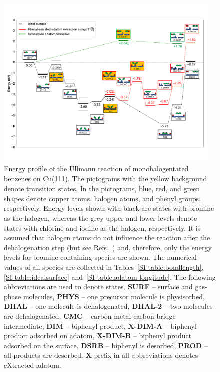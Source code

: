\documentclass[aps,prb,amsmath,amssymb,11pt]{revtex4-1}
\newcommand{\zhzh}{\color{black}}
\begin{document}
\begin{figure}[bt]
\centering
\includegraphics[width=0.96\textwidth]{Fig/main-profile.pdf}
\caption{
Energy profile of the Ullmann reaction of monohalogentated benzenes on Cu(111). {\zhzh The pictograms with the yellow background denote transition states.} In the pictograms, blue, red, and green shapes denote copper atoms, halogen atoms, and phenyl groups, respectively. %
Energy levels shown with black are states with bromine as the halogen, whereas the grey upper and lower levels denote states with chlorine and iodine as the halogen, respectively. It is assumed that halogen atoms do not influence the reaction after the dehalogenation step (but see Refs.~) and, therefore, only the energy levels for bromine containing species are shown. The numerical values of all species are collected in Tables~\ref{SI-table:bondlength}, \ref{SI-table:idealsurface} and~\ref{SI-table:adatom-longitude}. {\zhzh The following abbreviations are used to denote states. \textbf{SURF} -- surface and gas-phase molecules, \textbf{PHYS} -- one precursor molecule is physisorbed, \textbf{DHAL} -- one molecule is dehalogenated, \textbf{DHAL-2} -- two molecules are dehalogenated, \textbf{CMC} -- carbon-metal-carbon bridge intermediate, \textbf{DIM} -- biphenyl product, \textbf{X-DIM-A} -- biphenyl product adsorbed on adatom, \textbf{X-DIM-B} -- biphenyl product adsorbed on the surface, \textbf{DSRB} --  biphenyl is desorbed, \textbf{PROD} -- all products are desorbed. \textbf{X} prefix in all abbreviations denotes eXtracted adatom.}}
\label{fig:completeenergy}
\end{figure}
\end{document}
